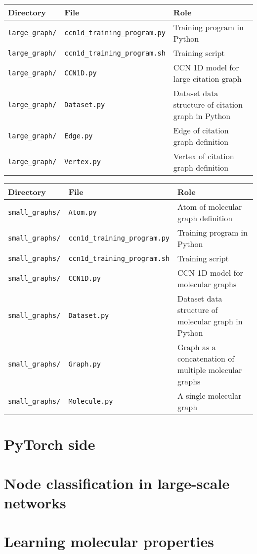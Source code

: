 \documentclass[12pt]{article}
\begin{document}
\begin{center}
\begin{tabular}{| p{} | p{} | p{} |}
\hline
Directory & File & Role \\
\hline
\texttt{large\_graph/}
&
\texttt{ccn1d\_training\_program.py}
& 
Training program in Python
\\
\hline
\texttt{large\_graph/}
&
\texttt{ccn1d\_training\_program.sh}
& 
Training script
\\
\hline
\texttt{large\_graph/}
&
\texttt{CCN1D.py}
& 
CCN 1D model for large citation graph
\\
\hline
\texttt{large\_graph/}
&
\texttt{Dataset.py}
& 
Dataset data structure of citation graph in Python
\\
\hline
\texttt{large\_graph/}
&
\texttt{Edge.py}
& 
Edge of citation graph definition
\\
\hline
\texttt{large\_graph/}
&
\texttt{Vertex.py}
& 
Vertex of citation graph definition
\\
\hline
\end{tabular}
\end{center}

\begin{center}
\begin{tabular}{| p{} | p{} | p{} |}
\hline
Directory & File & Role \\
\hline
\texttt{small\_graphs/}
&
\texttt{Atom.py}
& 
Atom of molecular graph definition
\\
\hline
\texttt{small\_graphs/}
&
\texttt{ccn1d\_training\_program.py}
& 
Training program in Python
\\
\hline
\texttt{small\_graphs/}
&
\texttt{ccn1d\_training\_program.sh}
& 
Training script
\\
\hline
\texttt{small\_graphs/}
&
\texttt{CCN1D.py}
& 
CCN 1D model for molecular graphs
\\
\hline
\texttt{small\_graphs/}
&
\texttt{Dataset.py}
& 
Dataset data structure of molecular graph in Python
\\
\hline
\texttt{small\_graphs/}
&
\texttt{Graph.py}
& 
Graph as a concatenation of multiple molecular graphs
\\
\hline
\texttt{small\_graphs/}
&
\texttt{Molecule.py}
& 
A single molecular graph
\\
\hline
\end{tabular}
\end{center}

\clearpage

\section{PyTorch side}

\clearpage

\section{Node classification in large-scale networks}

\clearpage

\section{Learning molecular properties}

\clearpage


{\small

}

\clearpage

\listoffigures
\end{document}
